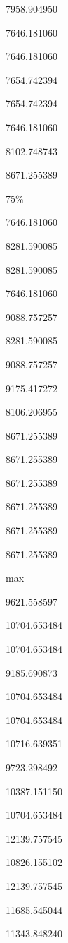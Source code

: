 \documentclass[
]{article}
\begin{document}
7958.904950

7646.181060

7646.181060

7654.742394

7654.742394

7646.181060

8102.748743

8671.255389

75\%

7646.181060

8281.590085

8281.590085

7646.181060

9088.757257

8281.590085

9088.757257

9175.417272

8106.206955

8671.255389

8671.255389

8671.255389

8671.255389

8671.255389

8671.255389

max

9621.558597

10704.653484

10704.653484

9185.690873

10704.653484

10704.653484

10716.639351

9723.298492

10387.151150

10704.653484

12139.757545

10826.155102

12139.757545

11685.545044

11343.848240
\end{document}
